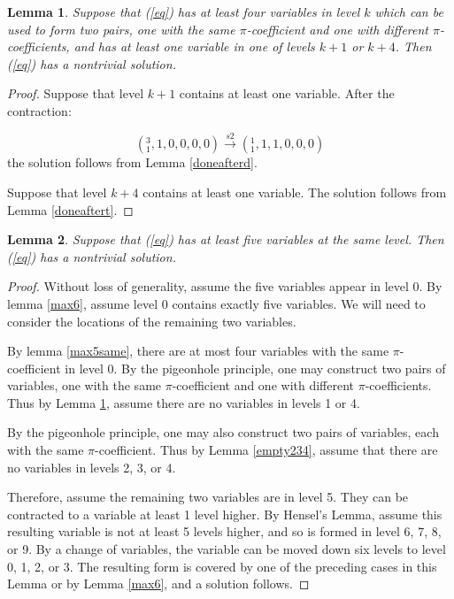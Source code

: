 \documentclass[draft]{publmathdeb}
\newtheorem{lemma}{Lemma}
\begin{document}
\begin{lemma} \label{empty14}
Suppose that (\ref{eq}) has at least four variables in level $k$ which can be used to form two pairs, one with the same $\pi$-coefficient and one with different $\pi$-coefficients, and has at least one variable in one of levels $k+1$ or $k+4$.  Then (\ref{eq}) has a nontrivial solution.
\end{lemma}
\begin{proof}
Suppose that level $k+1$ contains at least one variable.  After the contraction:

$$({}^{3}_{1},1,0,0,0,0) \xrightarrow{s2}
({}^{1}_{1},1,1,0,0,0)$$
the solution follows from Lemma \ref{doneafterd}.

Suppose that level $k+4$ contains at least one variable.  The solution follows from Lemma \ref{doneaftert}.
\end{proof}


\begin{lemma} \label{max5}
Suppose that (\ref{eq}) has at least five variables at the same level.  Then (\ref{eq}) has a nontrivial solution.
\end{lemma}
\begin{proof}
Without loss of generality, assume the five variables appear in level 0.  By lemma \ref{max6}, assume level 0 contains exactly five variables.  We will need to consider the locations of the remaining two variables.

By lemma \ref{max5same}, there are at most four variables with the same $\pi$-coefficient in level 0.  By the pigeonhole principle, one may construct two pairs of variables, one with the same $\pi$-coefficient and one with different $\pi$-coefficients.  Thus by Lemma \ref{empty14}, assume there are no variables in levels 1 or 4.

By the pigeonhole principle, one may also construct two pairs of variables, each with the same $\pi$-coefficient.  Thus by Lemma \ref{empty234}, assume that there are no variables in levels 2, 3, or 4.

Therefore, assume the remaining two variables are in level 5.  They can be contracted to a variable at least 1 level higher.  By Hensel's Lemma, assume this resulting variable is not at least 5 levels higher, and so is formed in level 6, 7, 8, or 9.  By a change of variables, the variable can be moved down six levels to level 0, 1, 2, or 3.  The resulting form is covered by one of the preceding cases in this Lemma or by Lemma \ref{max6}, and a solution follows.
\end{proof}
\end{document}
